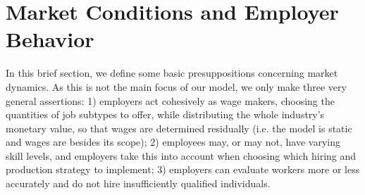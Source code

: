\documentclass[hidelinks, nonatbib]{elsarticle}
\begin{document}
\section{Market Conditions and Employer Behavior}
In this brief section, we define some basic presuppositions concerning market dynamics. As this is not the main focus of our model, we only make three very general assertions: 1) employers act cohesively as wage makers, choosing the quantities of job subtypes to offer, while distributing the whole industry's monetary value, so that wages are determined residually (i.e. the model is static and wages are besides its scope); 2) employees may, or may not, have varying skill levels, and employers take this into account when choosing which hiring and production strategy to implement; 3) employers can evaluate workers more or less accurately and do not hire insufficiently qualified individuals.
\end{document}
